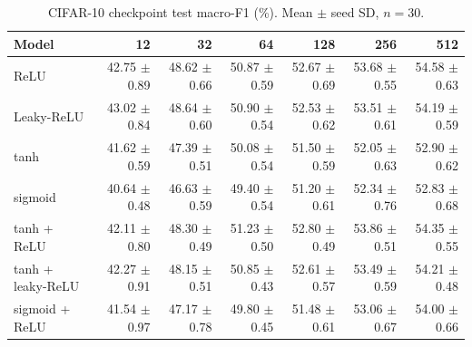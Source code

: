 \begin{table}[htbp]
\centering
\caption{CIFAR-10 checkpoint test macro-F1 (\%). Mean $\pm$ seed SD, $n=30$.}
\label{tab:cifar10:test_f1_best}
\footnotesize
\begin{tabular}{@{}lrrrrrr@{}}
\toprule
Model & 12 & 32 & 64 & 128 & 256 & 512 \\
\midrule
ReLU & 42.75 $\pm$ 0.89 & 48.62 $\pm$ 0.66 & 50.87 $\pm$ 0.59 & 52.67 $\pm$ 0.69 & 53.68 $\pm$ 0.55 & 54.58 $\pm$ 0.63 \\
Leaky-ReLU & 43.02 $\pm$ 0.84 & 48.64 $\pm$ 0.60 & 50.90 $\pm$ 0.54 & 52.53 $\pm$ 0.62 & 53.51 $\pm$ 0.61 & 54.19 $\pm$ 0.59 \\
tanh & 41.62 $\pm$ 0.59 & 47.39 $\pm$ 0.51 & 50.08 $\pm$ 0.54 & 51.50 $\pm$ 0.59 & 52.05 $\pm$ 0.63 & 52.90 $\pm$ 0.62 \\
sigmoid & 40.64 $\pm$ 0.48 & 46.63 $\pm$ 0.59 & 49.40 $\pm$ 0.54 & 51.20 $\pm$ 0.61 & 52.34 $\pm$ 0.76 & 52.83 $\pm$ 0.68 \\
tanh + ReLU & 42.11 $\pm$ 0.80 & 48.30 $\pm$ 0.49 & 51.23 $\pm$ 0.50 & 52.80 $\pm$ 0.49 & 53.86 $\pm$ 0.51 & 54.35 $\pm$ 0.55 \\
tanh + leaky-ReLU & 42.27 $\pm$ 0.91 & 48.15 $\pm$ 0.51 & 50.85 $\pm$ 0.43 & 52.61 $\pm$ 0.57 & 53.49 $\pm$ 0.59 & 54.21 $\pm$ 0.48 \\
sigmoid + ReLU & 41.54 $\pm$ 0.97 & 47.17 $\pm$ 0.78 & 49.80 $\pm$ 0.45 & 51.48 $\pm$ 0.61 & 53.06 $\pm$ 0.67 & 54.00 $\pm$ 0.66 \\
\bottomrule
\end{tabular}
\par{}
\end{table}
